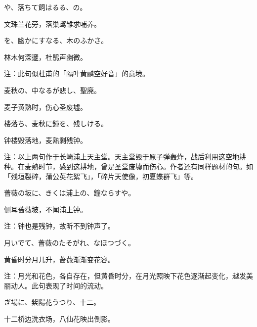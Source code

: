 \begin{haiku}
    {\FH {}や、落ちて飼はるる、の。}

    {\FK 文珠兰花旁，落巢鸢雏求哺养。}
\end{haiku}

\begin{haiku}
    {\FH {}を、幽かにすなる、木のふかさ。}

    {\FK 林木何深邃，杜鹃声幽微。}

    {\FT 注：此句似杜甫的「隔叶黄鹂空好音」的意境。}
\end{haiku}

\begin{haiku}
    {\FH 麦秋の、中なるが悲し、聖廃。}

    {\FK 麦子黄熟时，伤心圣废墟。}
\end{haiku}

\begin{haiku}
    {\FH {}楼落ち、麦秋に鐘を、残しける。}

    {\FK 钟楼毁落地，麦熟剩残钟。}

    {\FT 注：以上两句作于长崎浦上天主堂。天主堂毁于原子弹轰炸，战后利用这空地耕种。在麦熟时节，感到这耕地，曾是圣堂废墟而伤心。作者还有同样题材的句。如「残垣裂碎，蒲公英花絮飞」，「碎片天使像，初夏蝶群飞」等。}
\end{haiku}

\begin{haiku}
    {\FH 薔薇の坂に、きくは浦上の、鐘ならすや。}

    {\FK 侧耳蔷薇坡，不闻浦上钟。}

    {\FT 注：钟也是残钟，故昕不到钟声了。}
\end{haiku}

\begin{haiku}
    {\FH 月いでて、薔薇のたそがれ、なほつづく。}

    {\FK 黄昏时分月儿升，蔷薇渐渐变花容。}

    {\FT 注：月光和花色，各自存在，但黄昏时分，在月光照映下花色逐渐起变化，越发美丽动人。此句表现了时间的流动。}
\end{haiku}

\begin{haiku}
    {\FH {}ぎ場に、紫陽花うつり、十二。}

    {\FK 十二桥边洗衣场，八仙花映出倒影。}
\end{haiku}

